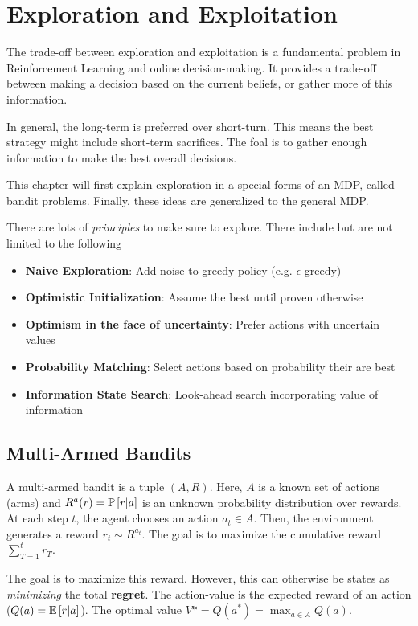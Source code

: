 \chapter{Exploration and Exploitation}

The trade-off between exploration and exploitation is a fundamental problem in Reinforcement Learning and online decision-making. It provides a trade-off between making a decision based on the current beliefs, or gather more of this information.

In general, the long-term is preferred over short-turn. This means the best strategy might include short-term sacrifices. The foal is to gather enough information to make the best overall decisions.

This chapter will first explain exploration in a special forms of an MDP, called bandit problems. Finally, these ideas are generalized to the general MDP.

There are lots of \textit{principles} to make sure to explore. There include but are not limited to the following
\begin{itemize}
	\item \textbf{Naive Exploration}: Add noise to greedy policy (e.g. $\epsilon$-greedy)
	\item \textbf{Optimistic Initialization}: Assume the best until proven otherwise
	\item \textbf{Optimism in the face of uncertainty}: Prefer actions with uncertain values
	\item \textbf{Probability Matching}: Select actions based on probability their are best
	\item \textbf{Information State Search}: Look-ahead search incorporating value of information
\end{itemize}

\section{Multi-Armed Bandits}

A multi-armed bandit is a tuple $(A, R)$. Here, $A$ is a known set of actions (arms) and $R^a(r) = \operatorname{\mathbb{P}}\left[r | a\right]$ is an unknown probability distribution over rewards. At each step $t$, the agent chooses an action $a_t \in A$. Then, the environment generates a reward $r_t \sim R^{a_t}$. The goal is to maximize the cumulative reward $\sum_{T = 1}^{t} r_T$.

The goal is to maximize this reward. However, this can otherwise be states as \textit{minimizing} the total \textbf{regret}. The action-value is the expected reward of an action ($Q(a) = \operatorname{\mathbb{E}}\left[r | a\right]$). The optimal value $V* = Q(a^*) = \max_{a \in A} Q(a)$.

